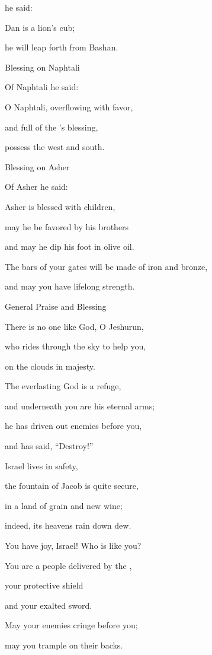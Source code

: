 {he said:
\par }{\Q Dan
is a lion’s
cub;
\par }{\Q he will leap
forth from
Bashan.
\par }{\SH Blessing on Naphtali
\par }{\Q {}Of Naphtali
he said:
\par }{\Q O Naphtali,
overflowing
with favor,
\par }{\Q and full
of the
{}’s
blessing,
\par }{\Q possess
the west
and south.
\par }{\SH Blessing on Asher
\par }{\Q {}Of Asher
he said:
\par }{\Q Asher
is blessed
with children,
\par }{\Q may he be favored by
his brothers
\par }{\Q and may he dip
his foot
in olive oil.
\par }{\Q {}The bars of your gates
will be made of iron
and bronze,
\par }{\Q and may you have lifelong
strength.
\par }{\SH General Praise and Blessing
\par }{\Q {}There is no
one like God,
O Jeshurun,
\par }{\Q who rides
through the sky
to help
you,
\par }{\Q on the clouds
in majesty.
\par }{\Q {}The everlasting
God
is a refuge,
\par }{\Q and underneath
you are his eternal
arms;
\par }{\Q he has driven out
enemies
before
you,
\par }{\Q and has said,
“Destroy!”
\par }{\Q {}Israel
lives
in safety,
\par }{\Q the fountain
of Jacob
is quite secure,
\par }{\Q in
a land
of grain
and new wine;
\par }{\Q indeed,
its heavens
rain down
dew.
\par }{\Q {}You have joy,
Israel! Who
is like
you?
\par }{\Q You are a people
delivered
by the
{},
\par }{\Q your protective
shield
\par }{\Q and your exalted
sword.
\par }{\Q May your enemies
cringe
before you;
\par }{\Q may you trample
on their backs.

}
